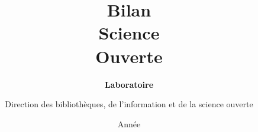 \documentclass[french, 11pt]{dibiso/biso}
\title{Bilan \\ Science \\ Ouverte}
\author{Direction des bibliothèques, de l'information et de la science ouverte}
\date{Année \reportyear}
\subtitle{\textbf{Laboratoire \labacronym} \\
  \medskip
  \labfullname
}
\begin{document}
\maketitle


\nocite{*} %

{
  \footnotesize
  \printbibliography
}

\makelastpagebiblio
 
\end{document}
